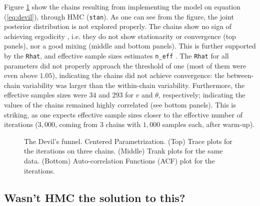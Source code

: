 Figure \ref{fig:devil_CE} show the chains resulting from implementing the model on equation (\ref{eq:devil}), through HMC (\texttt{stan}). As one can see from the figure, the joint posterior distribution is not explored properly. The chains show no sign of achieving ergodicity \cite{Metropolis_et_al_1953}, i.e. they do not show stationarity or convergence (top panels), nor a good mixing (middle and bottom panels). This is further supported by the \texttt{Rhat}, and effective sample sizes estimates \texttt{n\_eff} \cite{Gelman_et_al_2014}. The \texttt{Rhat} for all parameters did not properly approach the threshold of one (most of them were even above $1.05$), indicating the chains did not achieve convergence: the between-chain variability was larger than the within-chain variability. Furthermore, the effective samples sizes were $34$ and $293$ for $v$ and $\theta$, respectively; indicating the values of the chains remained highly correlated (see bottom panels). This is striking, as one expects effective sample sizes closer to the effective number of iterations ($3,000$, coming from $3$ chains with $1,000$ samples each, after warm-up).
%
\begin{figure}[h]
	\centering
	\begin{subfigure}
		\texttt{[image: 1\_trace\_CE\_simple]}
	\end{subfigure}
	\begin{subfigure}
		\texttt{[image: 1\_trank\_CE\_simple]}
	\end{subfigure}
	\begin{subfigure}
		\texttt{[image: 1\_acf\_CE\_simple]}
	\end{subfigure}
	\caption[The Devil's funnel. Centered Parametrization. Stan.]%
	{The Devil's funnel. Centered Parametrization. (Top) Trace plots for the iterations on three chains. (Middle) Trank plots for the same data. (Bottom) Auto-correlation Functions (ACF) plot for the iterations.}
	\label{fig:devil_CE}
\end{figure}


\subsection{Wasn't HMC the solution to this?}

